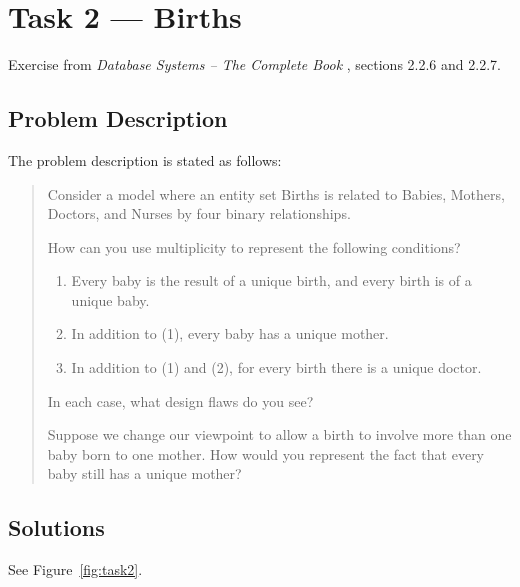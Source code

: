 %
%
%


\section{Task 2 --- Births}
Exercise from \emph{Database Systems -- The Complete Book} \cite{2dv513:dbs},
sections 2.2.6 and 2.2.7.

\subsection{Problem Description}
The problem description \cite{2dv513:assignment1-instructions} is stated as
follows:

\begin{quote}
  Consider a model where an entity set Births is related to Babies, Mothers,
  Doctors, and Nurses by four binary relationships.

  How can you use multiplicity to represent the following conditions?

  \begin{enumerate}
    \item
      Every baby is the result of a unique birth, and every birth is of a
      unique baby.
    \item
      In addition to (1), every baby has a unique mother.
    \item
      In addition to (1) and (2), for every birth there is a unique doctor.
  \end{enumerate}

  In each case, what design flaws do you see?

  Suppose we change our viewpoint to allow a birth to involve more than one
  baby born to one mother.
  How would you represent the fact that every baby still has a unique mother?
\end{quote}


\subsection{Solutions}
See Figure~\ref{fig:task2}.


